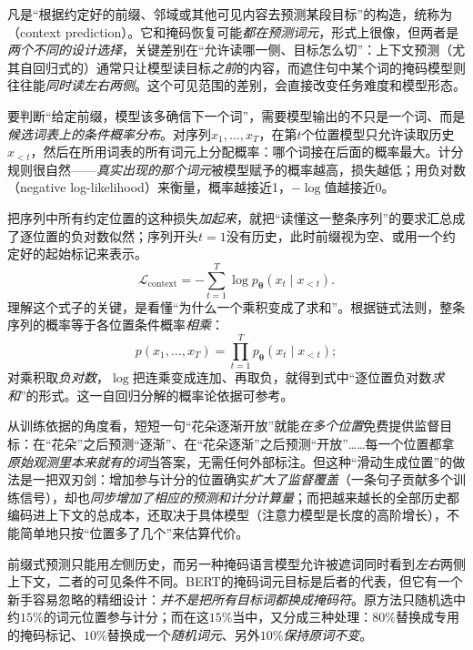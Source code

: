 凡是“根据约定好的前缀、邻域或其他可见内容去预测某段目标”的构造，统称为（context prediction）。它和掩码恢复可能\emph{都在预测词元}，形式上很像，但两者是\emph{两个不同的设计选择}，关键差别在“允许读哪一侧、目标怎么切”：上下文预测（尤其自回归式的）通常只让模型读目标\emph{之前}的内容，而遮住句中某个词的掩码模型则往往能\emph{同时读左右两侧}。这个可见范围的差别，会直接改变任务难度和模型形态。

要判断“给定前缀，模型该多确信下一个词”，需要模型输出的不只是一个词、而是\emph{候选词表上的条件概率分布}。对序列$x_1,\ldots,x_T$，在第$t$个位置模型只允许读取历史$x_{<t}$，然后在所用词表的所有词元上分配概率：哪个词接在后面的概率最大。计分规则很自然——\emph{真实出现的那个词元}被模型赋予的概率越高，损失越低；用负对数（negative log-likelihood）来衡量，概率越接近1，$-\log$值越接近0。

把序列中所有约定位置的这种损失\emph{加起来}，就把“读懂这一整条序列”的要求汇总成了逐位置的负对数似然；序列开头$t=1$没有历史，此时前缀视为空、或用一个约定好的起始标记来表示。
\begin{equation}
  \mathcal{L}_{\mathrm{context}}
  =-\sum_{t=1}^{T}\log p_{\bm{\theta}}(x_t\mid x_{<t}).
  \label{eq:data-derived-knowledge-context-prediction}
\end{equation}
理解这个式子的关键，是看懂“为什么一个乘积变成了求和”。根据链式法则，整条序列的概率等于各位置条件概率\emph{相乘}：
\[
  p(x_1,\ldots,x_T)=\prod_{t=1}^{T}p_{\bm{\theta}}(x_t\mid x_{<t});
\]
对乘积取\emph{负对数}，$\log$把连乘变成连加、再取负，就得到式中“逐位置负对数\emph{求和}”的形式。这一自回归分解的概率论依据可参考。

从训练依据的角度看，短短一句“花朵逐渐开放”就能\emph{在多个位置}免费提供监督目标：在“花朵”之后预测“逐渐”、在“花朵逐渐”之后预测“开放”……每一个位置都拿\emph{原始观测里本来就有的词}当答案，无需任何外部标注。但这种“滑动生成位置”的做法是一把双刃剑：增加参与计分的位置确实\emph{扩大了监督覆盖}（一条句子贡献多个训练信号），却也\emph{同步增加了相应的预测和计分计算量}；而把越来越长的全部历史都编码进上下文的总成本，还取决于具体模型（注意力模型是长度的高阶增长），不能简单地只按“位置多了几个”来估算代价。

前缀式预测只能用\emph{左}侧历史，而另一种掩码语言模型允许被遮词同时看到\emph{左右}两侧上下文，二者的可见条件不同。BERT的掩码词元目标是后者的代表，但它有一个新手容易忽略的精细设计：\emph{并不是把所有目标词都换成掩码符}。原方法只随机选中约$15\%$的词元位置参与计分；而在这$15\%$当中，又分成三种处理：$80\%$替换成专用的掩码标记、$10\%$替换成一个\emph{随机词元}、另外$10\%$\emph{保持原词不变}。

